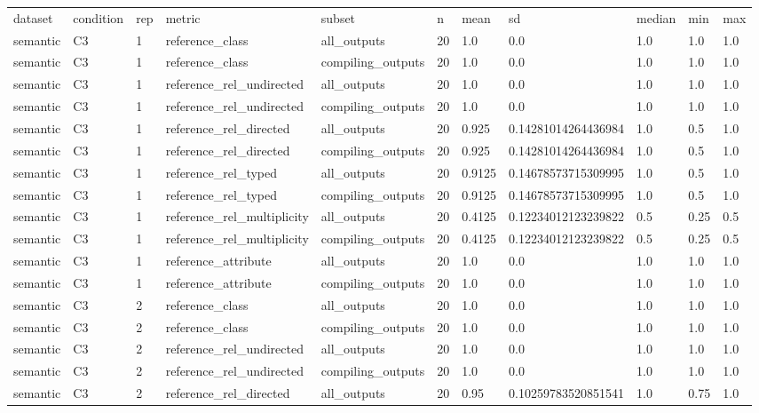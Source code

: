 \begin{tabular}{lllllllllll}
dataset & condition & rep & metric & subset & n & mean & sd & median & min & max \\
semantic & C3 & 1 & reference\_class & all\_outputs & 20 & 1.0 & 0.0 & 1.0 & 1.0 & 1.0 \\
semantic & C3 & 1 & reference\_class & compiling\_outputs & 20 & 1.0 & 0.0 & 1.0 & 1.0 & 1.0 \\
semantic & C3 & 1 & reference\_rel\_undirected & all\_outputs & 20 & 1.0 & 0.0 & 1.0 & 1.0 & 1.0 \\
semantic & C3 & 1 & reference\_rel\_undirected & compiling\_outputs & 20 & 1.0 & 0.0 & 1.0 & 1.0 & 1.0 \\
semantic & C3 & 1 & reference\_rel\_directed & all\_outputs & 20 & 0.925 & 0.14281014264436984 & 1.0 & 0.5 & 1.0 \\
semantic & C3 & 1 & reference\_rel\_directed & compiling\_outputs & 20 & 0.925 & 0.14281014264436984 & 1.0 & 0.5 & 1.0 \\
semantic & C3 & 1 & reference\_rel\_typed & all\_outputs & 20 & 0.9125 & 0.14678573715309995 & 1.0 & 0.5 & 1.0 \\
semantic & C3 & 1 & reference\_rel\_typed & compiling\_outputs & 20 & 0.9125 & 0.14678573715309995 & 1.0 & 0.5 & 1.0 \\
semantic & C3 & 1 & reference\_rel\_multiplicity & all\_outputs & 20 & 0.4125 & 0.12234012123239822 & 0.5 & 0.25 & 0.5 \\
semantic & C3 & 1 & reference\_rel\_multiplicity & compiling\_outputs & 20 & 0.4125 & 0.12234012123239822 & 0.5 & 0.25 & 0.5 \\
semantic & C3 & 1 & reference\_attribute & all\_outputs & 20 & 1.0 & 0.0 & 1.0 & 1.0 & 1.0 \\
semantic & C3 & 1 & reference\_attribute & compiling\_outputs & 20 & 1.0 & 0.0 & 1.0 & 1.0 & 1.0 \\
semantic & C3 & 2 & reference\_class & all\_outputs & 20 & 1.0 & 0.0 & 1.0 & 1.0 & 1.0 \\
semantic & C3 & 2 & reference\_class & compiling\_outputs & 20 & 1.0 & 0.0 & 1.0 & 1.0 & 1.0 \\
semantic & C3 & 2 & reference\_rel\_undirected & all\_outputs & 20 & 1.0 & 0.0 & 1.0 & 1.0 & 1.0 \\
semantic & C3 & 2 & reference\_rel\_undirected & compiling\_outputs & 20 & 1.0 & 0.0 & 1.0 & 1.0 & 1.0 \\
semantic & C3 & 2 & reference\_rel\_directed & all\_outputs & 20 & 0.95 & 0.10259783520851541 & 1.0 & 0.75 & 1.0 \\

\end{tabular}
